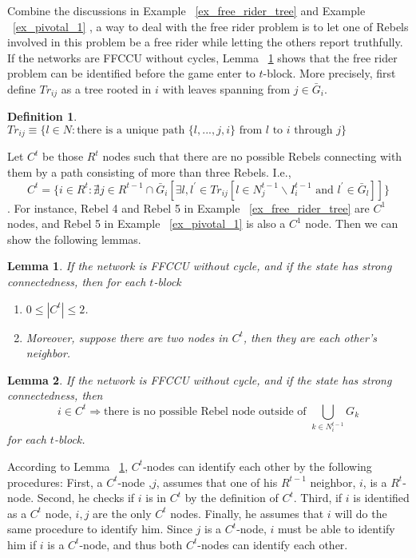 \documentclass[12pt,letterpaper]{article}
\newtheorem*{main result}{Main Result}
\newtheorem{lemma}{Lemma}[section]
\newtheorem{definition}{Definition}[section]
\theoremstyle{definition}
\theoremstyle{remark}
\theoremstyle{claim}
\begin{document}
Combine the discussions in Example ~\ref{ex_free_rider_tree} and Example ~\ref{ex_pivotal_1} , a way to deal with the free rider problem is to let one of Rebels involved in this problem be a free rider while letting the others report truthfully. If the networks are FFCCU without cycles, Lemma ~\ref{lemma_at_most_two_nodes} shows that the free rider problem can be identified before the game enter to $t$-block. More precisely, first define $Tr_{ij}$ as a tree rooted in $i$ with leaves spanning from $j\in \bar{G}_i$.

\begin{definition}
$Tr_{ij}\equiv \{l\in N:\text{there is a unique path $\{l,...,j,i\}$ from $l$ to $i$ through $j$}\}$
\end{definition}

Let $C^t$ be those $R^t$ nodes such that there are no possible Rebels connecting with them by a path consisting of more than three Rebels. I.e., 
\[C^t=\{i\in R^t:\nexists j\in R^{t-1}\cap \bar{G}_i[\exists l,l^{'}\in Tr_{ij}[l\in N^{t-1}_j\backslash I^{t-1}_i \text{ and } l^{'}\in \bar{G}_l]]\}\]
.  For instance, Rebel 4 and Rebel 5 in Example ~\ref{ex_free_rider_tree} are $C^1$ nodes, and Rebel 5 in Example ~\ref{ex_pivotal_1} is also a $C^1$ node. Then we can show the following lemmas. 

\begin{lemma}
\label{lemma_at_most_two_nodes}
If the network is FFCCU without cycle, and  if the state has strong connectedness, then for each $t$-block
\begin{enumerate}
\item $0\leq |C^t| \leq 2$.
\item Moreover, suppose there are two nodes in $C^t$, then they are each other's neighbor.
\end{enumerate}
\end{lemma}


\begin{lemma}
\label{lemma_no_node_outside}
If the network is FFCCU without cycle, and if the state has strong connectedness, then 
\[i\in C^t \Rightarrow \text{there is no possible Rebel node outside of }\bigcup_{k\in N^{t-1}_i}G_k\]
for each $t$-block.
\end{lemma}

According to Lemma ~\ref{lemma_at_most_two_nodes}, $C^t$-nodes can identify each other by the following procedures: First, a $C^t$-node ,$j$, assumes that one of his $R^{t-1}$ neighbor, $i$, is a $R^t$-node. Second, he checks if $i$ is in $C^t$ by the definition of $C^t$. Third, if $i$ is identified as a $C^t$ node, $i,j$ are the only $C^t$ nodes. Finally, he assumes that $i$ will do the same procedure to identify him. Since $j$ is a $C^t$-node, $i$ must be able to identify him if $i$ is a $C^t$-node, and thus both $C^t$-nodes can identify each other.
\end{document}
